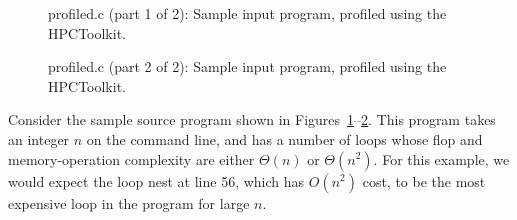 \begin{figure}[!h]
{\indent
{\mySmallFontSize
\begin{latexonly}
   
\end{latexonly}

\begin{htmlonly}
   
\end{htmlonly}

}
}
\caption{profiled.c (part 1 of 2): Sample input program, profiled using the HPCToolkit.}
\label{Tutorial:roseHPCT:profiled:aa}
\end{figure}

\begin{figure}[!h]
{\indent
{\mySmallFontSize
\begin{latexonly}
   
\end{latexonly}

\begin{htmlonly}
   
\end{htmlonly}

}
}
\caption{profiled.c (part 2 of 2): Sample input program, profiled using the HPCToolkit.}
\label{Tutorial:roseHPCT:profiled:ab}
\end{figure}

Consider the sample source program shown in
Figures~\ref{Tutorial:roseHPCT:profiled:aa}--\ref{Tutorial:roseHPCT:profiled:ab}.
This program takes an integer $n$ on the command line, and has a
number of loops whose flop and memory-operation complexity are either
$\Theta(n)$ or $\Theta(n^2)$. For this example, we would expect the
loop nest at line 56, which has $O(n^2)$ cost, to be the most
expensive loop in the program for large $n$.

